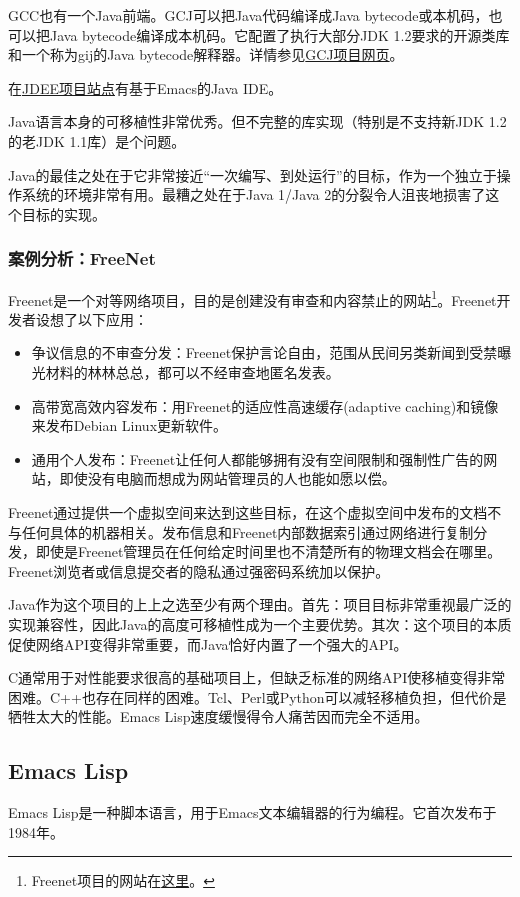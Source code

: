 \documentclass[12pt,oneside]{book}
\begin{document}
GCC也有一个Java前端。GCJ可以把Java代码编译成Java bytecode或本机码，也可以把Java bytecode编译成本机码。它配置了执行大部分JDK 1.2要求的开源类库和一个称为gij的Java bytecode解释器。详情参见\href{http://gcc.gnu.org/java/}{GCJ项目网页}。

在\href{http://jdee.sunsite.dk/}{JDEE项目站点}有基于Emacs的Java IDE。

Java语言本身的可移植性非常优秀。但不完整的库实现（特别是不支持新JDK 1.2的老JDK 1.1库）是个问题。

Java的最佳之处在于它非常接近“一次编写、到处运行”的目标，作为一个独立于操作系统的环境非常有用。最糟之处在于Java 1/Java 2的分裂令人沮丧地损害了这个目标的实现。


\subsubsection{案例分析：FreeNet}
Freenet是一个对等网络项目，目的是创建没有审查和内容禁止的网站\footnote{Freenet项目的网站在\href{http://freenetproject.org/}{这里}。}。Freenet开发者设想了以下应用：

\begin{itemize}
\item 争议信息的不审查分发：Freenet保护言论自由，范围从民间另类新闻到受禁曝光材料的林林总总，都可以不经审查地匿名发表。
\item  高带宽高效内容发布：用Freenet的适应性高速缓存(adaptive caching)和镜像来发布Debian Linux更新软件。
\item 通用个人发布：Freenet让任何人都能够拥有没有空间限制和强制性广告的网站，即使没有电脑而想成为网站管理员的人也能如愿以偿。
\end{itemize}

Freenet通过提供一个虚拟空间来达到这些目标，在这个虚拟空间中发布的文档不与任何具体的机器相关。发布信息和Freenet内部数据索引通过网络进行复制分发，即使是Freenet管理员在任何给定时间里也不清楚所有的物理文档会在哪里。Freenet浏览者或信息提交者的隐私通过强密码系统加以保护。

Java作为这个项目的上上之选至少有两个理由。首先：项目目标非常重视最广泛的实现兼容性，因此Java的高度可移植性成为一个主要优势。其次：这个项目的本质促使网络API变得非常重要，而Java恰好内置了一个强大的API。

C通常用于对性能要求很高的基础项目上，但缺乏标准的网络API使移植变得非常困难。C++也存在同样的困难。Tcl、Perl或Python可以减轻移植负担，但代价是牺牲太大的性能。Emacs Lisp速度缓慢得令人痛苦因而完全不适用。

\subsection{Emacs Lisp}
Emacs Lisp是一种脚本语言，用于Emacs文本编辑器的行为编程。它首次发布于1984年。
\end{document}
